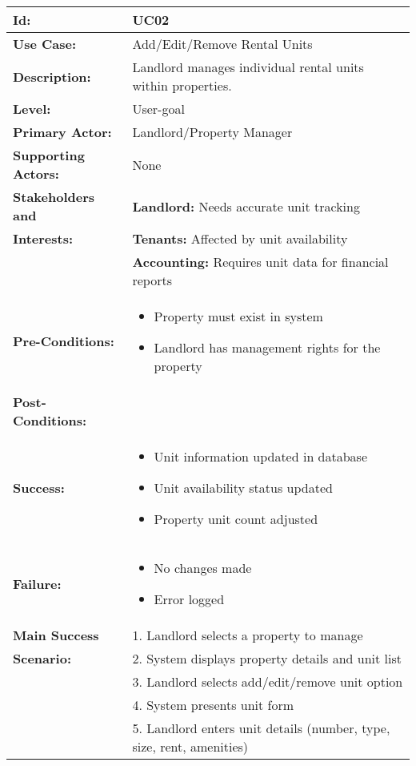 \documentclass[12pt]{article}
\begin{document}
\begin{longtable}{|p{3cm}|p{11cm}|}
\hline
\textbf{Id:} & UC02 \\
\hline
\textbf{Use Case:} & Add/Edit/Remove Rental Units \\
\hline
\textbf{Description:} & Landlord manages individual rental units within properties. \\
\hline
\textbf{Level:} & User-goal \\
\hline
\textbf{Primary Actor:} & Landlord/Property Manager \\
\hline
\textbf{Supporting Actors:} & None \\
\hline
\textbf{Stakeholders and} & \textbf{Landlord:} Needs accurate unit tracking \\
\textbf{Interests:} & \textbf{Tenants:} Affected by unit availability \\
& \textbf{Accounting:} Requires unit data for financial reports \\
\hline
\textbf{Pre-Conditions:} & 
\begin{itemize}
    \item Property must exist in system
    \item Landlord has management rights for the property
\end{itemize} \\
\hline
\textbf{Post-Conditions:} & \\
\textbf{Success:} & 
\begin{itemize}
    \item Unit information updated in database
    \item Unit availability status updated
    \item Property unit count adjusted
\end{itemize} \\
\textbf{Failure:} & 
\begin{itemize}
    \item No changes made
    \item Error logged
\end{itemize} \\
\hline
\textbf{Main Success} & 1. Landlord selects a property to manage \\
\textbf{Scenario:} & 2. System displays property details and unit list \\
& 3. Landlord selects add/edit/remove unit option \\
& 4. System presents unit form \\
& 5. Landlord enters unit details (number, type, size, rent, amenities) \\

\end{longtable}
\end{document}
